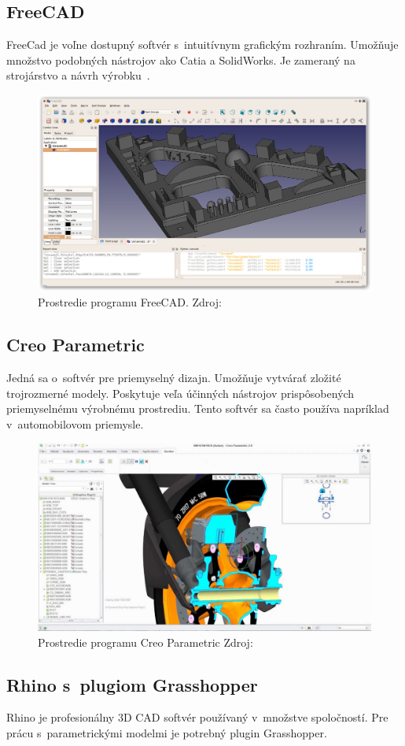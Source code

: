 \subsection*{FreeCAD}
FreeCad je voľne dostupný softvér s~intuitívnym grafickým rozhraním. Umožňuje množstvo podobných nástrojov ako Catia a SolidWorks. Je zameraný na strojárstvo a návrh výrobku~\cite{freecad_2018}.

\begin{figure}[H]
    \centering
    \includegraphics[width = 0.5\linewidth]{obrazky-figures/programs/Freecad_default.jpg}
    \caption{Prostredie programu FreeCAD. Zdroj: \cite{freecad_2018}}
    \label{fig:FreeCAD}
\end{figure}


\subsection*{Creo Parametric}
Jedná sa o~softvér pre priemyselný dizajn. Umožňuje vytvárať zložité trojrozmerné modely. Poskytuje veľa účinných nástrojov prispôsobených priemyselnému výrobnému prostrediu. Tento softvér sa často používa napríklad v~automobilovom priemysle.

\begin{figure}[H]
    \centering
    \includegraphics[width = 0.5\linewidth]{obrazky-figures/programs/Creo_Parametric.jpg}
    \caption{Prostredie programu Creo Parametric Zdroj: \cite{ptc_2013} }
    \label{fig:Creo}
\end{figure}


\subsection*{Rhino s~plugiom Grasshopper}
Rhino je profesionálny 3D CAD softvér používaný v~množstve spoločností. Pre prácu s~parametrickými modelmi je potrebný plugin Grasshopper. 

